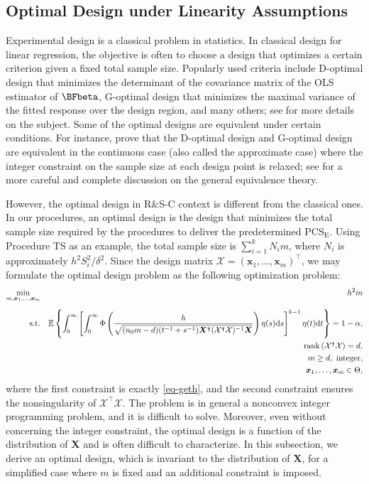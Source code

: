 \documentclass[ijoc,nonblindrev]{informs3}
\def\E{\mathbb{E}}
\def\ud{\mathrm{d}}
\def\bx{{\bm x}}
\def\bX{{\bm X}}
\def\cX{{\mathcal X}}
\def\PCSE{\mathrm{PCS}_{\mathrm{E}}}
\begin{document}
\subsection{Optimal Design under Linearity Assumptions} \label{subsec-optimal}

Experimental design is a classical problem in statistics.
In classical design for linear regression, the objective is often to choose a design that optimizes a certain criterion given a fixed total sample size.
Popularly used criteria include D-optimal design that minimizes the determinant of the covariance matrix of the OLS estimator of $\BFbeta$,
G-optimal design that minimizes the maximal variance of the fitted response over the design region, and many others; see \citet[Chapter 2]{silvey1980optimal} for more details on the subject.
Some of the optimal designs are equivalent under certain conditions.
For instance, \citet{kiefer1960equivalence} prove that the D-optimal design and G-optimal design are equivalent in the continuous case (also called the approximate case)
where the integer constraint on the sample size at each design point is relaxed; see \citet[Chapter 3]{silvey1980optimal} for a more careful and complete discussion on the general equivalence theory.

However, the optimal design in R\&S-C context is different from the classical ones. In our procedures, an optimal design is the design that minimizes the total sample size required by the procedures to deliver the predetermined $\PCSE$.
Using Procedure TS as an example, the total sample size is $\sum_{i=1}^k N_i m$, where $N_i$ is approximately $h^2S_i^2/\delta^2$.
Since the design matrix $\cX=(\bx_1,\ldots,\bx_m)^\intercal$, we may formulate the optimal design problem as the following optimization problem:
\begin{eqnarray*}
\underset{m,\bx_1,\ldots,\bx_m}{\textnormal{min}} && h^2 m \\[5pt]
\textnormal{s.t.} && \E \left\{ \int_0^\infty \left[\int_0^\infty \Phi \left( \frac{h}{\sqrt{(n_0m-d) (t^{-1}+s^{-1})\bX^\intercal (\cX^\intercal \cX)^{-1} \bX}} \right) \eta(s)\ud s \right]^{k-1} \eta(t) \ud t \right\} = 1-\alpha, \\
&& \textnormal{rank}\left(\cX^\intercal\cX\right) = d,\\
&& m \ge d,\ \textnormal{integer},\\
&& \bx_1,\ldots,\bx_m \in \Theta,
\end{eqnarray*}
where the first constraint is exactly \eqref{eq-geth}, and the second constraint ensures the nonsingularity of $\cX^\intercal\cX$.
The problem is in general a nonconvex integer programming problem, and it is difficult to solve.
Moreover, even without concerning the integer constraint, the optimal design is a function of the distribution of $\bX$ and is often difficult to characterize.
In this subsection, we derive an optimal design, which is invariant to the distribution of $\bX$, for a simplified case where $m$ is fixed and an additional constraint is imposed.
\end{document}
